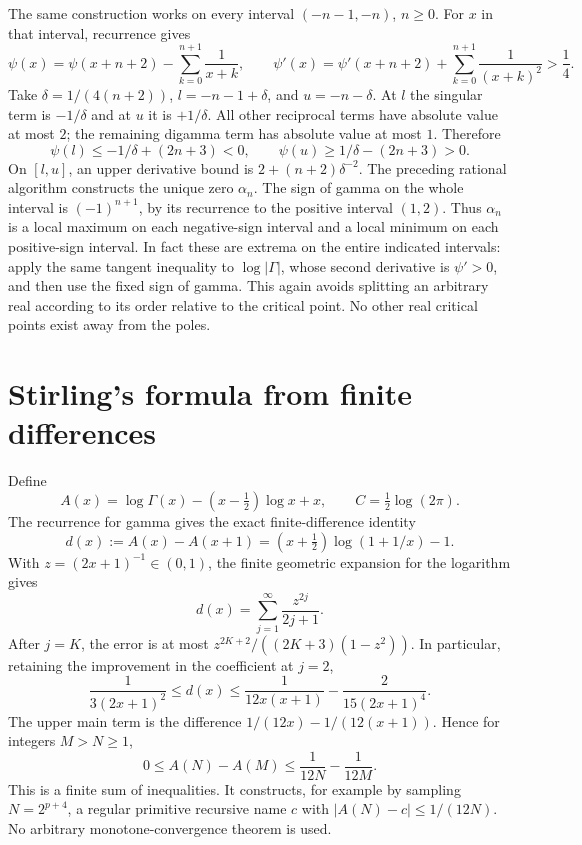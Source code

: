 The same construction works on every interval $(-n-1,-n)$, $n\ge0$.
For $x$ in that interval, recurrence gives
\begin{equation}\label{eq:negative-digamma}
 \psi(x)=\psi(x+n+2)-\sum_{k=0}^{n+1}\frac1{x+k},\qquad
 \psi'(x)=\psi'(x+n+2)+\sum_{k=0}^{n+1}\frac1{(x+k)^2}>\frac14.
\end{equation}
Take $\delta=1/(4(n+2))$, $l=-n-1+\delta$, and $u=-n-\delta$.
At $l$ the singular term is $-1/\delta$ and at $u$ it is $+1/\delta$.
All other reciprocal terms have absolute value at most $2$; the remaining
digamma term has absolute value at most $1$.  Therefore
\[
 \psi(l)\le-1/\delta+(2n+3)<0,
 \qquad\psi(u)\ge1/\delta-(2n+3)>0.
\]
On $[l,u]$, an upper derivative bound is $2+(n+2)\delta^{-2}$.
The preceding rational algorithm constructs the unique zero $\alpha_n$.
The sign of gamma on the whole interval is $(-1)^{n+1}$, by its recurrence
to the positive interval $(1,2)$.  Thus $\alpha_n$ is a local maximum on
each negative-sign interval and a local minimum on each positive-sign
interval.  In fact these are extrema on the entire indicated intervals:
apply the same tangent inequality to $\log|\Gamma|$, whose second
derivative is $\psi'>0$, and then use the fixed sign of gamma.  This
again avoids splitting an arbitrary real according to its order relative
to the critical point.  No other real critical points exist away from
the poles.

\section{Stirling's formula from finite differences}
\label{sec:stirling-differences}

Define
\[
 A(x)=\log\Gamma(x)-(x-\tfrac12)\log x+x,\qquad
 C=\tfrac12\log(2\pi).
\]
The recurrence for gamma gives the exact finite-difference identity
\[
 d(x):=A(x)-A(x+1)
 =(x+\tfrac12)\log(1+1/x)-1.
\]
With $z=(2x+1)^{-1}\in(0,1)$, the finite geometric expansion for the
logarithm gives
\begin{equation}\label{eq:stirling-d-series}
 d(x)=\sum_{j=1}^{\infty}\frac{z^{2j}}{2j+1}.
\end{equation}
After $j=K$, the error is at most
$z^{2K+2}/((2K+3)(1-z^2))$.  In particular, retaining the improvement in
the coefficient at $j=2$,
\begin{equation}\label{eq:stirling-d-telescoper}
 \frac1{3(2x+1)^2}\le d(x)
 \le\frac1{12x(x+1)}-\frac2{15(2x+1)^4}.
\end{equation}
The upper main term is the difference $1/(12x)-1/(12(x+1))$.
Hence for integers $M>N\ge1$,
\[
 0\le A(N)-A(M)\le\frac1{12N}-\frac1{12M}.
\]
This is a finite sum of inequalities.  It constructs, for example by
sampling $N=2^{p+4}$, a regular primitive recursive name $c$ with
$|A(N)-c|\le1/(12N)$.  No arbitrary monotone-convergence theorem is used.

